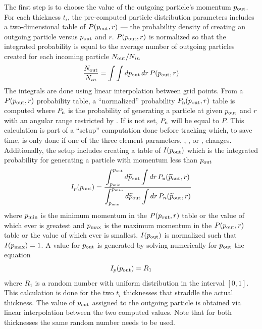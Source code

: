 The first step is to choose the value of the outgoing particle's momentum $p_{\text{out}}$. For each
thickness $t_i$, the pre-computed particle distribution parameters includes a two-dimensional table
of $P(p_{\text{out}}, r)$ --- the probability density of creating an outgoing particle versus
$p_{\text{out}}$ and $r$. $P(p_{\text{out}},r)$ is normalized so that the integrated probability is equal
to the average number of outgoing particles created for each incoming particle $N_{\text{out}}/N_{in}$
\begin{equation}
  \frac{N_{\text{out}}}{N_{in}} = \int \int dp_{\text{out}} \, dr \, P(p_{\text{out}}, r)
  \label{nnprp}
\end{equation}
The integrals are done using linear interpolation between grid points.  From a $P(p_{\text{out}},r)$
probability table, a ``normalized'' probability $P_{\text{n}}(p_{\text{out}},r)$ table is computed where
$P_{\text{n}}$ is the probability of generating a particle at given $p_{\text{out}}$ and $r$ with an
angular range restricted by . If  is not set, $P_{\text{n}}$ will
be equal to $P$.  This calculation is part of a ``setup'' computation done before tracking which, to
save time, is only done if one of the three element parameters, , , or
, changes. Additionally, the setup includes creating a table of $I(p_{\text{out}})$
which is the integrated probability for generating a particle with momentum less than $p_{\text{out}}$
\begin{equation}
  I_p(p_{\text{out}}) = \frac{\displaystyle \int_{p_{\text{min}}}^{p_{\text{out}}} d{\widetilde p}_{\text{out}} 
  \int dr \, P_{\text{n}}({\widetilde p}_{\text{out}}, r)}
  {\displaystyle \int_{p_{\text{min}}}^{p_{\text{max}}} d{\widetilde p}_{\text{out}} \int dr \, P_{n}({\widetilde p}_{\text{out}}, r)}
\end{equation}
where $p_{\text{min}}$ is the minimum momentum in the $P(p_{\text{out}}, r)$ table or the value of
 which ever is greatest and $p_{\text{max}}$ is the maximum momentum in the
$P(p_{\text{out}}, r)$ table or the value of  which ever is smallest. $I(p_{\text{out}})$
is normalized such that $I(p_{\text{max}}) = 1$. A value for $p_{\text{out}}$ is generated by solving
numerically for $p_{\text{out}}$ the equation
\begin{equation}
  I_p(p_{\text{out}}) = R_1
\end{equation}
where $R_1$ is a random number with uniform distribution in the interval $[0,1]$.  This
calculation is done for the two $t_i$ thicknesses that straddle the actual thickness. The value of
$p_{\text{out}}$ assigned to the outgoing particle is obtained via linear interpolation between the two
computed values. Note that for both thicknesses the same random number needs to be used.

